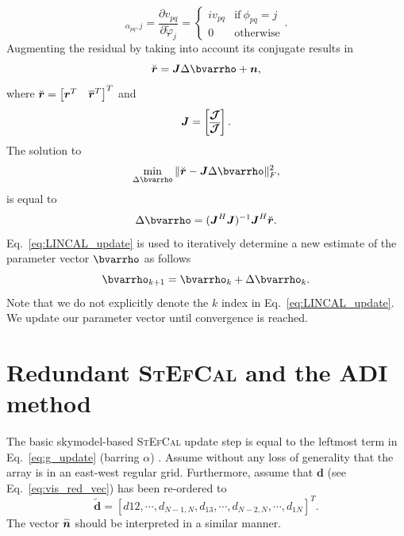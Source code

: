 \documentclass[useAMS,usenatbib]{mn2e}
\newcommand{\br}{\bmath{r}}
\newcommand{\bn}{\bmath{n}}
\newcommand{\bJ}{\bmath{J}}
\newcommand{\bR}{\bmath{R}}
\newcommand{\bmJ}{\bmath{\mathcal{J}}}
\newcommand{\conj}[1]{\overline{#1}}
\begin{document}
\begin{equation}
 [\bR]_{\alpha_{pq},j} =  \frac{\partial v_{pq}}{\partial \widetilde{\varphi}_j} = \begin{cases} 
    i v_{pq} &\textrm{if}~\phi_{pq}=j\\
    0 & \textrm{otherwise}
   \end{cases}.
\end{equation}
Augmenting the residual by taking into account its conjugate results in 
\begin{equation}
\breve{\br} = \bJ \Delta \bvarrho + \bn, 
\end{equation}
where $\breve{\br} = \begin{bmatrix}\br^T & \conj{\br}^T \end{bmatrix}^T$ and 
\begin{equation}
\label{eq:Jac_lin}
\bJ = 
\begin{bmatrix}
 \bmJ\\  
 \conj{\bmJ}
\end{bmatrix}.
\end{equation}
The solution to 
\begin{equation}
 \min_{\Delta \bvarrho} \| \breve{\br} - \bJ \Delta \bvarrho\|_F^2,
\end{equation}
is equal to 
\begin{equation}
\label{eq:LINCAL_update}
\Delta \bvarrho = (\bJ^H\bJ)^{-1} \bJ^H\breve{\br}. 
\end{equation}
Eq.~\eqref{eq:LINCAL_update} is used to iteratively determine a new estimate of the parameter vector $\bvarrho$ as follows
\begin{equation}
\label{eq:new_rho}
\bvarrho_{k+1} = \bvarrho_k + \Delta \bvarrho_k. 
\end{equation}
Note that we do not explicitly denote the $k$ index in Eq.~\eqref{eq:LINCAL_update}. We update our parameter vector until convergence is reached.   

\section{Redundant \textsc{StEfCal} and the ADI method}
\label{sec:red_stef_ADI}
The basic skymodel-based \textsc{StEfCal} update step is equal to  the leftmost term in Eq.~\eqref{eq:g_update} (barring $\alpha$) \citep{Salvini2014}.
Assume without any loss of generality that the array is in an east-west regular grid. Furthermore, assume that $\boldsymbol{d}$ (see Eq.~\eqref{eq:vis_red_vec}) has been re-ordered to
\begin{equation}
\widetilde{\boldsymbol{d}} = \left[d{12},\cdots,d_{N-1,N},d_{13},\cdots,d_{N-2,N},\cdots,d_{1N}\right]^T .
\end{equation}
The vector $\widetilde{\bn}$ should be interpreted in a similar manner.
\end{document}

